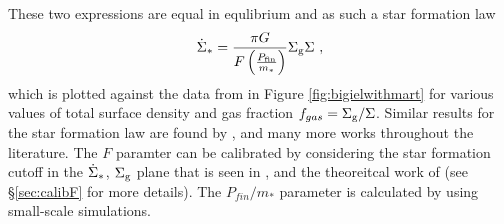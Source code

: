 These two expressions are equal in equlibrium and as such a star formation law
\begin{equation}
\label{eqn:martsfr}
\dot{\Sigma}_* = \frac{\pi G}{F \left(\frac{P_\mathrm{fin}}{m_*}\right)} \Sigma_\mathrm{g} \Sigma~,
\end{equation}
which is plotted against the data from \citet{bigiel_star_2008} in Figure \ref{fig:bigielwithmart} for various values of total surface density and gas fraction $f_{gas} = \Sigma_\mathrm{g}/\Sigma$.
Similar results for the star formation law are found by \citet{ostriker_maximally_2011, faucher-giguere_feedback-regulated_2013, martizzi_supernova_2016}, and many more works throughout the literature.
The $F$ paramter can be calibrated by considering the star formation cutoff in the $\dot{\Sigma}_*$, $\Sigma_\mathrm{g}$ plane that is seen in \citet{bigiel_star_2008}, and the theoreitcal work of \citet{schaye_star_2004} (see \S \ref{sec:calibF} for more details).
The $P_{fin}/m_*$ parameter is calculated by using small-scale simulations.
